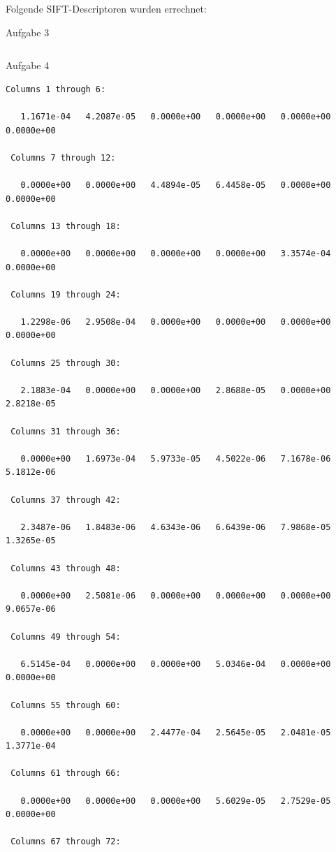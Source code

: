 Folgende SIFT-Descriptoren wurden errechnet:

Aufgabe 3
\lstset{language=matlab}
\begin{lstlisting}[caption={Berechnung des SIFT-Descriptor-Vektors}]

\end{lstlisting}

Aufgabe 4
\lstset{language=matlab}
\begin{lstlisting}[caption={Berechnung des SIFT-Descriptor-Vektors}]
 Columns 1 through 6:

   1.1671e-04   4.2087e-05   0.0000e+00   0.0000e+00   0.0000e+00   0.0000e+00

 Columns 7 through 12:

   0.0000e+00   0.0000e+00   4.4894e-05   6.4458e-05   0.0000e+00   0.0000e+00

 Columns 13 through 18:

   0.0000e+00   0.0000e+00   0.0000e+00   0.0000e+00   3.3574e-04   0.0000e+00

 Columns 19 through 24:

   1.2298e-06   2.9508e-04   0.0000e+00   0.0000e+00   0.0000e+00   0.0000e+00

 Columns 25 through 30:

   2.1883e-04   0.0000e+00   0.0000e+00   2.8688e-05   0.0000e+00   2.8218e-05

 Columns 31 through 36:

   0.0000e+00   1.6973e-04   5.9733e-05   4.5022e-06   7.1678e-06   5.1812e-06

 Columns 37 through 42:

   2.3487e-06   1.8483e-06   4.6343e-06   6.6439e-06   7.9868e-05   1.3265e-05

 Columns 43 through 48:

   0.0000e+00   2.5081e-06   0.0000e+00   0.0000e+00   0.0000e+00   9.0657e-06

 Columns 49 through 54:

   6.5145e-04   0.0000e+00   0.0000e+00   5.0346e-04   0.0000e+00   0.0000e+00

 Columns 55 through 60:

   0.0000e+00   0.0000e+00   2.4477e-04   2.5645e-05   2.0481e-05   1.3771e-04

 Columns 61 through 66:

   0.0000e+00   0.0000e+00   0.0000e+00   5.6029e-05   2.7529e-05   0.0000e+00

 Columns 67 through 72:


\end{lstlisting}
